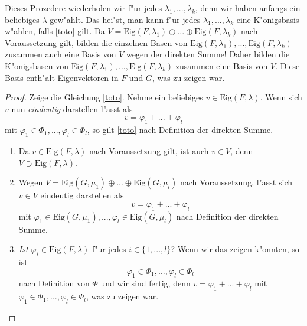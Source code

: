 \documentclass[a4paper,fontsize=12pt]{article}
\theoremstyle{plain}
\begin{document}
Dieses Prozedere wiederholen wir f"ur jedes $\lambda_1,...,\lambda_k$, denn wir haben anfangs ein beliebiges $\lambda$ gew"ahlt. Das hei"st, man kann f"ur jedes $\lambda_1,...,\lambda_k$ eine K"onigsbasis w"ahlen, falls \eqref{toto} gilt. Da $V = \mathrm{Eig}(F,\lambda_1) \oplus ... \oplus \mathrm{Eig}(F,\lambda_k)$ nach Voraussetzung gilt, bilden die einzelnen Basen von $\mathrm{Eig}(F,\lambda_1),...,\mathrm{Eig}(F,\lambda_k)$ zusammen auch eine Basis von $V$ wegen der direkten Summe! Daher bilden die K"onigsbasen von $\mathrm{Eig}(F,\lambda_1),...,\mathrm{Eig}(F,\lambda_k)$ zusammen eine Basis von $V$. Diese Basis enth"alt Eigenvektoren in $F$ und $G$, was zu zeigen war.

\begin{proof}
    Zeige die Gleichung \eqref{toto}. Nehme ein beliebiges $v \in \mathrm{Eig}(F,\lambda)$. Wenn sich $v$ nun \emph{eindeutig} darstellen l"asst als 
    \[
        v = \varphi_1 + ... + \varphi_l
    \]
    mit $\varphi_1 \in \Phi_1, ..., \varphi_l \in \Phi_l$, so gilt \eqref{toto} nach Definition der direkten Summe.
    
    \begin{enumerate}
        \item Da $v \in \mathrm{Eig}(F,\lambda)$ nach Voraussetzung gilt, ist auch $v \in V$, denn $V \supset \mathrm{Eig}(F,\lambda)$.
        
        \item Wegen $V = \mathrm{Eig}(G,\mu_1) \oplus ... \oplus \mathrm{Eig}(G,\mu_l)$ nach Voraussetzung, l"asst sich $v \in V$ eindeutig darstellen als 
        \[
            v = \varphi_1 + ... + \varphi_l
        \]
        mit \emph{$\varphi_1 \in \mathrm{Eig}(G,\mu_1), ..., \varphi_l \in \mathrm{Eig}(G,\mu_l)$} nach Definition der direkten Summe.
        
        \item \emph{Ist $\varphi_i \in \mathrm{Eig}(F,\lambda)$} f"ur jedes $i \in \{1,...,l\}$? Wenn wir das zeigen k"onnten, so ist 
        \[
            \varphi_1 \in \Phi_1, ..., \varphi_l \in \Phi_l
        \]
        nach Definition von $\Phi$ und wir sind fertig, denn $v = \varphi_1 + ... + \varphi_l$ mit $\varphi_1 \in \Phi_1, ..., \varphi_l \in \Phi_l$, was zu zeigen war.
    \end{enumerate}
    

\end{proof}
\end{document}
